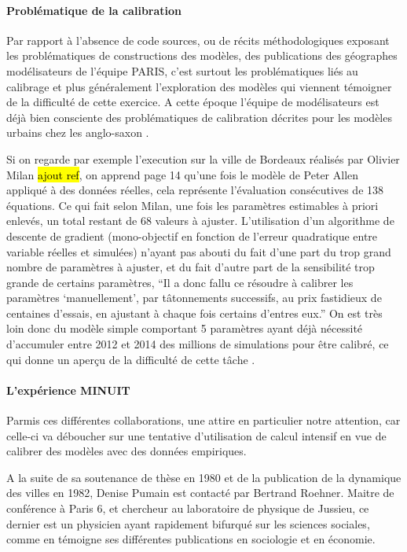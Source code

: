 \paragraph{Problématique de la calibration}

Par rapport à l'absence de code sources, ou de récits méthodologiques exposant les problématiques de constructions des modèles, des publications des géographes modélisateurs de l’équipe PARIS, c’est surtout les problématiques liés au calibrage et plus généralement l’exploration des modèles qui viennent témoigner de la difficulté de cette exercice. A cette époque l'équipe de modélisateurs est déjà bien consciente des problématiques de calibration décrites pour les modèles urbains chez les anglo-saxon \autocite{Batty1976}.

Si on regarde par exemple l'execution sur la ville de Bordeaux réalisés par Olivier Milan \hl{ajout ref}, on apprend page 14 qu'une fois le modèle de Peter Allen appliqué à des données réelles, cela représente l'évaluation consécutives de 138 équations. Ce qui fait selon Milan, une fois les paramètres estimables à priori enlevés, un total restant de 68 valeurs à ajuster. L'utilisation d'un algorithme de descente de gradient (mono-objectif en fonction de l'erreur quadratique entre variable réelles et simulées) n'ayant pas abouti du fait d'une part du trop grand nombre de paramètres à ajuster, et du fait d'autre part de la sensibilité trop grande de certains paramètres, \enquote{Il a donc fallu ce résoudre à calibrer les paramètres \enquote{manuellement}, par tâtonnements successifs, au prix fastidieux de centaines d'essais, en ajustant à chaque fois certains d'entres eux.}  On est très loin donc du modèle simple comportant 5 paramètres ayant déjà nécessité d'accumuler entre 2012 et 2014 des millions de simulations pour être calibré, ce qui donne un aperçu de la difficulté de cette tâche \autocite{Schmitt2015}.

\paragraph{L'expérience MINUIT}

Parmis ces différentes collaborations, une attire en particulier notre attention, car celle-ci va déboucher sur une tentative d’utilisation de calcul intensif en vue de calibrer des modèles avec des données empiriques.

A la suite de sa soutenance de thèse en 1980 et de la publication de la dynamique des villes en 1982, Denise Pumain est contacté par Bertrand Roehner. Maitre de conférence à Paris 6, et chercheur au laboratoire de physique de Jussieu, ce dernier est un physicien ayant rapidement bifurqué sur les sciences sociales, comme en témoigne ses différentes publications en sociologie et en économie.

